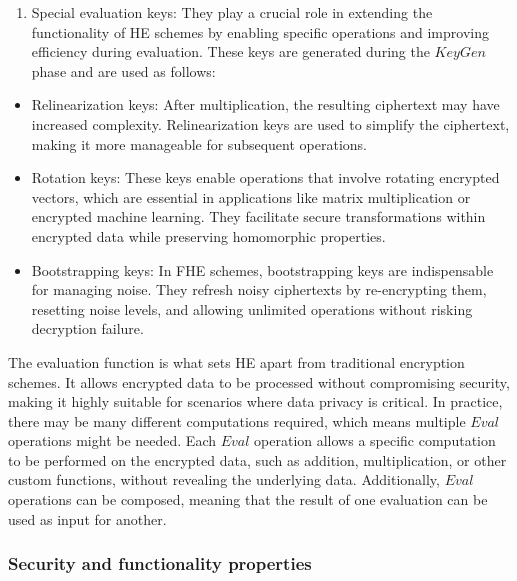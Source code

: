 \documentclass[
  letterpaper,
  DIV=11,
  numbers=noendperiod,
  oneside]{scrartcl}
\providecommand{\tightlist}{%
  \setlength{\itemsep}{0pt}\setlength{\parskip}{0pt}}\usepackage{longtable,booktabs,array}
\begin{document}
\begin{itemize}
  \begin{enumerate}
  \def\labelenumi{\arabic{enumi}.}
  \setcounter{enumi}{4}
  \tightlist
  \item
    Special evaluation keys: They play a crucial role in extending the
    functionality of HE schemes by enabling specific operations and
    improving efficiency during evaluation. These keys are generated
    during the \(KeyGen\) phase and are used as follows:
  \end{enumerate}

  \begin{itemize}
  \item
    Relinearization keys: After multiplication, the resulting ciphertext
    may have increased complexity. Relinearization keys are used to
    simplify the ciphertext, making it more manageable for subsequent
    operations.
  \item
    Rotation keys: These keys enable operations that involve rotating
    encrypted vectors, which are essential in applications like matrix
    multiplication or encrypted machine learning. They facilitate secure
    transformations within encrypted data while preserving homomorphic
    properties.
  \item
    Bootstrapping keys: In FHE schemes, bootstrapping keys are
    indispensable for managing noise. They refresh noisy ciphertexts by
    re-encrypting them, resetting noise levels, and allowing unlimited
    operations without risking decryption failure.
  \end{itemize}

  The evaluation function is what sets HE apart from traditional
  encryption schemes. It allows encrypted data to be processed without
  compromising security, making it highly suitable for scenarios where
  data privacy is critical. In practice, there may be many different
  computations required, which means multiple \(Eval\) operations might
  be needed. Each \(Eval\) operation allows a specific computation to be
  performed on the encrypted data, such as addition, multiplication, or
  other custom functions, without revealing the underlying data.
  Additionally, \(Eval\) operations can be composed, meaning that the
  result of one evaluation can be used as input for another.
\end{itemize}

\subsubsection{Security and functionality
properties}\label{security-and-functionality-properties}
\end{document}
